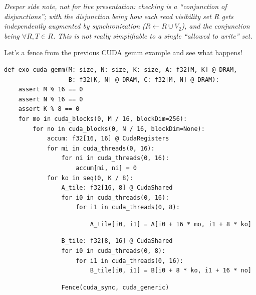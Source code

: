 \hfill
\begin{minipage}[t]{0.7\textwidth}\fixminipage
\vspace{6mm}
\textit{Deeper side note, not for live presentation:  checking is a ``conjunction of disjunctions''; with the disjunction being how each read visibility set $R$ gets independently augmented by synchronization ($R \leftarrow R \cup V_2$), and the conjunction being $\forall R, T \in R$.
This is not really simplifiable to a single ``allowed to write'' set.}
\end{minipage}

\newpage
{}

\begin{minipage}[t]{0.4\textwidth}\codeminipage
Let's  a fence from the previous CUDA gemm example and see what happens!
\vspace{6mm}
\tiny
\begin{verbatim}
def exo_cuda_gemm(M: size, N: size, K: size, A: f32[M, K] @ DRAM,
                  B: f32[K, N] @ DRAM, C: f32[M, N] @ DRAM):
    assert M % 16 == 0
    assert N % 16 == 0
    assert K % 8 == 0
    for mo in cuda_blocks(0, M / 16, blockDim=256):
        for no in cuda_blocks(0, N / 16, blockDim=None):
            accum: f32[16, 16] @ CudaRegisters
            for mi in cuda_threads(0, 16):
                for ni in cuda_threads(0, 16):
                    accum[mi, ni] = 0
            for ko in seq(0, K / 8):
                A_tile: f32[16, 8] @ CudaShared
                for i0 in cuda_threads(0, 16):
                    for i1 in cuda_threads(0, 8):
\end{verbatim}
\begin{mdframed}[style=MyFrame, backgroundcolor=yellowBoxBg]
\color{yellowBoxFg}
\begin{verbatim}
                        A_tile[i0, i1] = A[i0 + 16 * mo, i1 + 8 * ko]
\end{verbatim}
\end{mdframed}
\begin{verbatim}
                B_tile: f32[8, 16] @ CudaShared
                for i0 in cuda_threads(0, 8):
                    for i1 in cuda_threads(0, 16):
                        B_tile[i0, i1] = B[i0 + 8 * ko, i1 + 16 * no]
\end{verbatim}
\begin{mdframed}[style=MyFrame, backgroundcolor=greenBoxBg]
\color{greenBoxFg}
\begin{verbatim}
                Fence(cuda_sync, cuda_generic)

\end{verbatim}
\end{mdframed}
\end{minipage}
